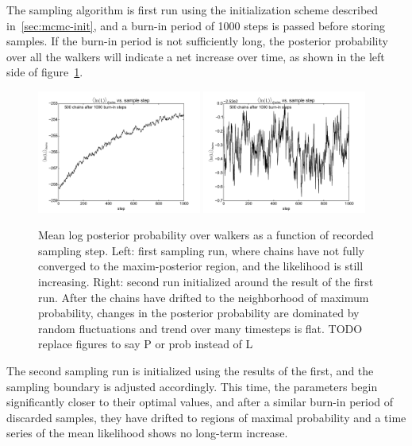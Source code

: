\documentclass[12pt]{article}
\begin{document}
The sampling algorithm is first run using the initialization scheme described in~\ref{sec:mcmc-init}, and a burn-in period of 1000 steps is passed before storing samples. If the burn-in period is not sufficiently long, the posterior probability over all the walkers will indicate a net increase over time, as shown in the left side of figure~\ref{fig:timeseries}.
\begin{figure}[tb]
  \begin{center}
    \includegraphics[width=0.48\textwidth]{AuAu200MB/1/lnprob-vs-step}
    \includegraphics[width=0.48\textwidth]{AuAu200MB/2/lnprob-vs-step}
  \end{center}
  \caption{Mean log posterior probability over walkers as a function of recorded sampling step. Left: first sampling run, where chains have not fully converged to the maxim-posterior region, and the likelihood is still increasing. Right: second run initialized around the result of the first run. After the chains have drifted to the neighborhood of maximum probability, changes in the posterior probability are dominated by random fluctuations and trend over many timesteps is flat. TODO replace figures to say P or prob instead of L}
  \label{fig:timeseries}
\end{figure}
The second sampling run is initialized using the results of the first, and the sampling boundary is adjusted accordingly. This time, the parameters begin significantly closer to their optimal values, and after a similar burn-in period of discarded samples, they have drifted to regions of maximal probability and a time series of the mean likelihood shows no long-term increase.
\end{document}
